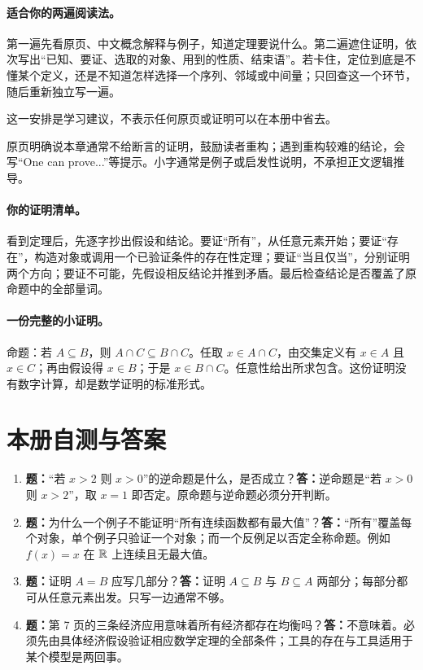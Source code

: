\paragraph{适合你的两遍阅读法。}第一遍先看原页、中文概念解释与例子，知道定理要说什么。第二遍遮住证明，依次写出“已知、要证、选取的对象、用到的性质、结束语”。若卡住，定位到底是不懂某个定义，还是不知道怎样选择一个序列、邻域或中间量；只回查这一个环节，随后重新独立写一遍。

这一安排是学习建议，不表示任何原页或证明可以在本册中省去。

原页明确说本章通常不给断言的证明，鼓励读者重构；遇到重构较难的结论，会写“One can prove...”等提示。小字通常是例子或启发性说明，不承担正文逻辑推导。

\paragraph{你的证明清单。}看到定理后，先逐字抄出假设和结论。要证“所有”，从任意元素开始；要证“存在”，构造对象或调用一个已验证条件的存在性定理；要证“当且仅当”，分别证明两个方向；要证不可能，先假设相反结论并推到矛盾。最后检查结论是否覆盖了原命题中的全部量词。

\paragraph{一份完整的小证明。}命题：若 $A\subseteq B$，则 $A\cap C\subseteq B\cap C$。任取 $x\in A\cap C$，由交集定义有 $x\in A$ 且 $x\in C$；再由假设得 $x\in B$；于是 $x\in B\cap C$。任意性给出所求包含。这份证明没有数字计算，却是数学证明的标准形式。

\section*{本册自测与答案}
\begin{enumerate}
\item \textbf{题：}“若 $x>2$ 则 $x>0$”的逆命题是什么，是否成立？\textbf{答：}逆命题是“若 $x>0$ 则 $x>2$”，取 $x=1$ 即否定。原命题与逆命题必须分开判断。
\item \textbf{题：}为什么一个例子不能证明“所有连续函数都有最大值”？\textbf{答：}“所有”覆盖每个对象，单个例子只验证一个对象；而一个反例足以否定全称命题。例如 $f(x)=x$ 在 $\mathbb{R}$ 上连续且无最大值。
\item \textbf{题：}证明 $A=B$ 应写几部分？\textbf{答：}证明 $A\subseteq B$ 与 $B\subseteq A$ 两部分；每部分都可从任意元素出发。只写一边通常不够。
\item \textbf{题：}第 7 页的三条经济应用意味着所有经济都存在均衡吗？\textbf{答：}不意味着。必须先由具体经济假设验证相应数学定理的全部条件；工具的存在与工具适用于某个模型是两回事。
\end{enumerate}
